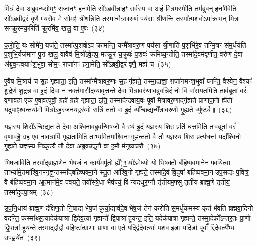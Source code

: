 {\anuvakamend[{स्व॒द॒य॒ सोमाः᳚ स॒हाष्टाविꣳ॑शतिश्च}]}

मि॒त्रं दे॒वा अ॑ब्रुव॒न्थ्सोम॒ꣳ॒ राजा॑नꣳ हना॒मेति॒ सो᳚\-ऽब्रवी॒न्नाहꣳ सर्व॑स्य॒ वा अ॒हं मि॒त्रम॒स्मीति॒ तम॑ब्रुव॒न्॒ हना॑मै॒वेति॒ सो᳚\-ऽब्रवी॒द्वरं॑ वृणै॒ पय॑सै॒व मे॒ सोमꣴ॑ श्रीण॒न्निति॒ तस्मा᳚न्मैत्रावरु॒णं पय॑सा श्रीणन्ति॒ तस्मा᳚त्प॒शवो\-ऽपा᳚क्रामन् मि॒त्रः सन्क्रू॒रम॑क॒रिति॑ क्रू॒रमि॑व॒ खलु॒ वा ए॒षः~(३४)\ip

क॒रो॒ति॒ यः सोमे॑न॒ यज॑ते॒ तस्मा᳚त्प॒शवो\-ऽप॑ क्रामन्ति॒ यन्मै᳚त्रावरु॒णं पय॑सा श्री॒णाति॑ प॒शुभि॑रे॒व तन्मि॒त्रꣳ स॑म॒र्धय॑ति प॒शुभि॒र्यज॑मानं पु॒रा खलु॒ वावैवं मि॒त्रो॑\-ऽवे॒दप॒ मत्क्रू॒रं च॒क्रुषः॑ प॒शवः॑ क्रमिष्य॒न्तीति॒ तस्मा॑दे॒वम॑वृणीत॒ वरु॑णं दे॒वा अ॑ब्रुव॒न्त्वयाꣳ॑श॒भुवा॒ सोम॒ꣳ॒ राजा॑नꣳ हना॒मेति॒ सो᳚\-ऽब्रवी॒द्वरं॑ वृणै॒ मह्यं॑ च~(३५)\ip

ए॒वैष मि॒त्राय॑ च स॒ह गृ॑ह्याता॒ इति॒ तस्मा᳚न्मैत्रावरु॒णः स॒ह गृ॑ह्यते॒ तस्मा॒द्राज्ञा॒ राजा॑नमꣳश॒भुवा᳚ घ्नन्ति॒ वैश्ये॑न॒ वैश्यꣳ॑ शू॒द्रेण॑ शू॒द्रन्न वा इ॒दं दिवा॒ न नक्त॑मासी॒दव्या॑वृत्त॒न्ते दे॒वा मि॒त्रावरु॑णावब्रुवन्नि॒दं नो॒ वि वा॑सयत॒मिति॒ ताव॑ब्रूतां॒ वरं॑ वृणावहा॒ एक॑ ए॒वावत्पूर्वो॒ ग्रहो॑ ग्रहो गृह्याता॒ इति॒ तस्मा॑दैन्द्रवाय॒वः पूर्वो॑ मैत्रावरु॒णाद्गृ॑ह्यते प्राणापा॒नौ ह्ये॑तौ यदु॑पाꣴश्वन्तर्या॒मौ मि॒त्रो\-ऽह॒रज॑नय॒द्वरु॑णो॒ रात्रिं॒ ततो॒ वा इ॒दं व्यौ᳚च्छ॒द्यन्मै᳚त्रावरु॒णो गृ॒ह्यते॒ व्यु॑ष्ट्यै॥~(३६)\ip

{\anuvakamend[{ए॒ष चै᳚न्द्रवाय॒वो द्वाविꣳ॑शतिश्च}]}

य॒ज्ञस्य॒ शिरो᳚\-ऽच्छिद्यत॒ ते दे॒वा अ॒श्विना॑वब्रुवन्भि॒षजौ॒ वै स्थ॑ इ॒दं य॒ज्ञस्य॒ शिरः॒ प्रति॑ धत्त॒मिति॒ ताव॑ब्रूतां॒ वरं॑ वृणावहै॒ ग्रह॑ ए॒व ना॒वत्रापि॑ गृह्यता॒मिति॒ ताभ्या॑मे॒तमा᳚श्वि॒नम॑गृह्ण॒न्ततो॒ वै तौ य॒ज्ञस्य॒ शिरः॒ प्रत्य॑धत्तां॒ यदा᳚श्वि॒नो गृ॒ह्यते॑ य॒ज्ञस्य॒ निष्कृ॑त्यै॒ तौ दे॒वा अ॑ब्रुव॒न्नपू॑तौ॒ वा इ॒मौ म॑नुष्यच॒रौ~(३७)\ip

भि॒षजा॒विति॒ तस्मा᳚द्\-ब्राह्म॒णेन॑ भेष॒जं न का॒र्य॑मपू॑तो॒ ह्ये᳚(१॒)षो॑\-ऽमे॒ध्यो यो भि॒षक्तौ ब॑हिष्पवमा॒नेन॑ पवयि॒त्वा ताभ्या॑मे॒तमा᳚श्वि॒नम॑गृह्ण॒न्तस्मा᳚द्\-बहिष्पवमा॒ने स्तु॒त आ᳚श्वि॒नो गृ॑ह्यते॒ तस्मा॑दे॒वं वि॒दुषा॑ बहिष्पवमा॒न उ॑प॒सद्यः॑ प॒वित्रं॒ वै ब॑हिष्पवमा॒न आ॒त्मान॑मे॒व प॑वयते॒ तयो᳚स्त्रे॒धा भैष॑ज्यं॒ वि न्य॑दधुर॒ग्नौ तृ॑तीयम॒फ्सु तृती॑यं ब्राह्म॒णे तृती॑यं॒ तस्मा॑दुदपा॒त्रम्~(३८)\ip

उ॒प॒नि॒धाय॑ ब्राह्म॒णं द॑क्षिण॒तो नि॒षाद्य॑ भेष॒जं कु॑र्या॒द्याव॑दे॒व भे॑ष॒जं तेन॑ करोति स॒मर्धु॑कमस्य कृ॒तं भ॑वति ब्रह्मवा॒दिनो॑ वदन्ति॒ कस्मा᳚थ्स॒त्यादेक॑पात्रा द्विदेव॒त्या॑ गृ॒ह्यन्ते᳚ द्वि॒पात्रा॑ हूयन्त॒ इति॒ यदेक॑पात्रा गृ॒ह्यन्ते॒ तस्मा॒देको᳚\-ऽन्तर॒तः प्रा॒णो द्वि॒पात्रा॑ हूयन्ते॒ तस्मा॒द्द्वौद्वौ॑ ब॒हिष्टा᳚त्प्रा॒णाः प्रा॒णा वा ए॒ते यद्द्वि॑देव॒त्याः᳚ प॒शव॒ इडा॒ यदिडां॒ पूर्वां᳚ द्विदेव॒त्ये᳚भ्य उप॒ह्वये॑त~(३९)\ip

